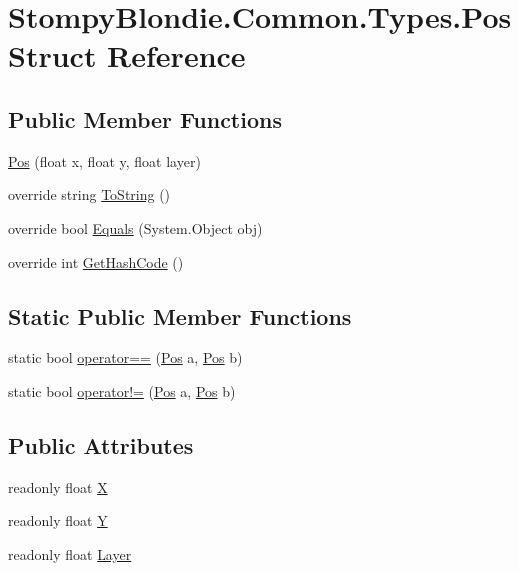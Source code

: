 \hypertarget{struct_stompy_blondie_1_1_common_1_1_types_1_1_pos}{}\section{Stompy\+Blondie.\+Common.\+Types.\+Pos Struct Reference}
\label{struct_stompy_blondie_1_1_common_1_1_types_1_1_pos}
\subsection*{Public Member Functions}
\begin{DoxyCompactItemize}
\item 
\mbox{\hyperlink{struct_stompy_blondie_1_1_common_1_1_types_1_1_pos_a799bf0737c9061d2d085c8585b11e1eb}{Pos}} (float x, float y, float layer)
\item 
override string \mbox{\hyperlink{struct_stompy_blondie_1_1_common_1_1_types_1_1_pos_a86fe2f5e48eb144cb37807dbaf4a7ac4}{To\+String}} ()
\item 
override bool \mbox{\hyperlink{struct_stompy_blondie_1_1_common_1_1_types_1_1_pos_a6f2f34f43731202a1eb218a230fc1c8c}{Equals}} (System.\+Object obj)
\item 
override int \mbox{\hyperlink{struct_stompy_blondie_1_1_common_1_1_types_1_1_pos_aa60271bf962645b90a74d140b1086ffd}{Get\+Hash\+Code}} ()
\end{DoxyCompactItemize}
\subsection*{Static Public Member Functions}
\begin{DoxyCompactItemize}
\item 
static bool \mbox{\hyperlink{struct_stompy_blondie_1_1_common_1_1_types_1_1_pos_ab97b703ef32c20b8884efaf126c70361}{operator==}} (\mbox{\hyperlink{struct_stompy_blondie_1_1_common_1_1_types_1_1_pos}{Pos}} a, \mbox{\hyperlink{struct_stompy_blondie_1_1_common_1_1_types_1_1_pos}{Pos}} b)
\item 
static bool \mbox{\hyperlink{struct_stompy_blondie_1_1_common_1_1_types_1_1_pos_a4972b4ecc4fd560fc31613e687016dbe}{operator!=}} (\mbox{\hyperlink{struct_stompy_blondie_1_1_common_1_1_types_1_1_pos}{Pos}} a, \mbox{\hyperlink{struct_stompy_blondie_1_1_common_1_1_types_1_1_pos}{Pos}} b)
\end{DoxyCompactItemize}
\subsection*{Public Attributes}
\begin{DoxyCompactItemize}
\item 
readonly float \mbox{\hyperlink{struct_stompy_blondie_1_1_common_1_1_types_1_1_pos_a50dc3dd8daa99fb4d2bcc052bcf2e219}{X}}
\item 
readonly float \mbox{\hyperlink{struct_stompy_blondie_1_1_common_1_1_types_1_1_pos_a07913bf1a36289c0fe28c280c10390c5}{Y}}
\item 
readonly float \mbox{\hyperlink{struct_stompy_blondie_1_1_common_1_1_types_1_1_pos_a9e3f36f4ed1d57b2c6b8a7520f82b283}{Layer}}
\end{DoxyCompactItemize}


